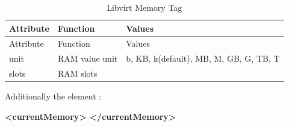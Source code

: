 \documentclass[
  14pt,
  english,
  a4paper,
]{scrreprt}
\newenvironment{Shaded}{}{}
\newcommand{\KeywordTok}[1]{\textcolor[rgb]{0.00,0.44,0.13}{\textbf{#1}}}
\begin{document}
\hypertarget{tbl:lvirt_mem_tag}{}
\begin{longtable}[]{@{}lll@{}}
\caption{\label{tbl:lvirt_mem_tag}Libvirt Memory Tag}\tabularnewline
\toprule
\begin{minipage}[b]{0.15\columnwidth}\raggedright
Attribute\strut
\end{minipage} & \begin{minipage}[b]{0.22\columnwidth}\raggedright
Function\strut
\end{minipage} & \begin{minipage}[b]{0.52\columnwidth}\raggedright
Values\strut
\end{minipage}\tabularnewline
\midrule
\endfirsthead
\toprule
\begin{minipage}[b]{0.15\columnwidth}\raggedright
Attribute\strut
\end{minipage} & \begin{minipage}[b]{0.22\columnwidth}\raggedright
Function\strut
\end{minipage} & \begin{minipage}[b]{0.52\columnwidth}\raggedright
Values\strut
\end{minipage}\tabularnewline
\midrule
\endhead
\begin{minipage}[t]{0.15\columnwidth}\raggedright
unit\strut
\end{minipage} & \begin{minipage}[t]{0.22\columnwidth}\raggedright
RAM value unit\strut
\end{minipage} & \begin{minipage}[t]{0.52\columnwidth}\raggedright
b, KB, k(default), MB, M, GB, G, TB, T\strut
\end{minipage}\tabularnewline
\begin{minipage}[t]{0.15\columnwidth}\raggedright
slots\strut
\end{minipage} & \begin{minipage}[t]{0.22\columnwidth}\raggedright
RAM slots\strut
\end{minipage} & \begin{minipage}[t]{0.52\columnwidth}\raggedright
\strut
\end{minipage}\tabularnewline
\bottomrule
\end{longtable}

Additionally the element :

\begin{Shaded}
\begin{Highlighting}[]
\KeywordTok{\textless{}currentMemory\textgreater{}}
\KeywordTok{\textless{}/currentMemory\textgreater{}}
\end{Highlighting}
\end{Shaded}
\end{document}
